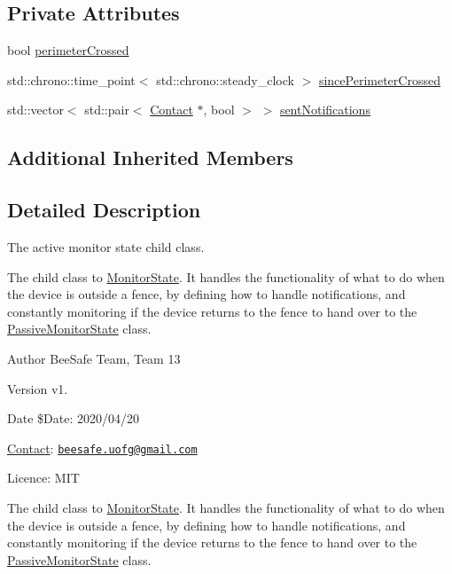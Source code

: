 \subsection*{Private Attributes}
\begin{DoxyCompactItemize}
\item 
bool \hyperlink{class_active_monitor_state_af4c93e1be350ea9cf4ac97f97abaf79e}{perimeter\+Crossed}
\item 
std\+::chrono\+::time\+\_\+point$<$ std\+::chrono\+::steady\+\_\+clock $>$ \hyperlink{class_active_monitor_state_a4313399b0922fccd66ecea2fcf77c08f}{since\+Perimeter\+Crossed}
\item 
std\+::vector$<$ std\+::pair$<$ \hyperlink{class_contact}{Contact} $\ast$, bool $>$ $>$ \hyperlink{class_active_monitor_state_a25493a87079926faf7d03b8587ad9f62}{sent\+Notifications}
\end{DoxyCompactItemize}
\subsection*{Additional Inherited Members}


\subsection{Detailed Description}
The active monitor state child class. 

The child class to \hyperlink{class_monitor_state}{Monitor\+State}. It handles the functionality of what to do when the device is outside a fence, by defining how to handle notifications, and constantly monitoring if the device returns to the fence to hand over to the \hyperlink{class_passive_monitor_state}{Passive\+Monitor\+State} class.

\begin{DoxyAuthor}{Author}
Bee\+Safe Team, Team 13
\end{DoxyAuthor}
\begin{DoxyVersion}{Version}
v1.
\end{DoxyVersion}
\begin{DoxyDate}{Date}
\$\+Date\+: 2020/04/20
\end{DoxyDate}
\hyperlink{class_contact}{Contact}\+: \href{mailto:beesafe.uofg@gmail.com}{\tt beesafe.\+uofg@gmail.\+com}

Licence\+: M\+IT

The child class to \hyperlink{class_monitor_state}{Monitor\+State}. It handles the functionality of what to do when the device is outside a fence, by defining how to handle notifications, and constantly monitoring if the device returns to the fence to hand over to the \hyperlink{class_passive_monitor_state}{Passive\+Monitor\+State} class.

